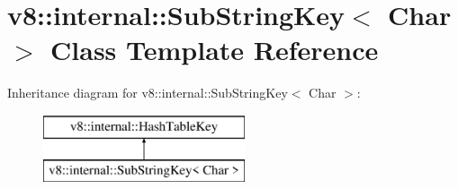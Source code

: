 \hypertarget{classv8_1_1internal_1_1_sub_string_key}{}\section{v8\+:\+:internal\+:\+:Sub\+String\+Key$<$ Char $>$ Class Template Reference}
\label{classv8_1_1internal_1_1_sub_string_key}
Inheritance diagram for v8\+:\+:internal\+:\+:Sub\+String\+Key$<$ Char $>$\+:\begin{figure}[H]
\begin{center}
\leavevmode
\includegraphics[height=2.000000cm]{classv8_1_1internal_1_1_sub_string_key}
\end{center}
\end{figure}

